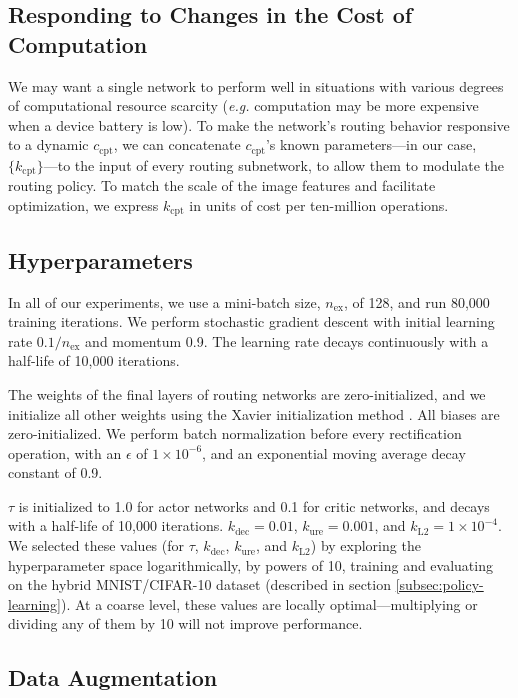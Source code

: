 \documentclass{article}
\begin{document}
  \subsection{Responding to Changes in the Cost of Computation}
  \label{subsec:dyn-kcpt}

  We may want a single network to perform well in situations with various degrees of computational resource scarcity (\textit{e.g.} computation may be more expensive when a device battery is low). To make the network's routing behavior responsive to a dynamic $c_\text{cpt}$, we can concatenate $c_\text{cpt}$'s known parameters---in our case, $\{k_\text{cpt}\}$---to the input of every routing subnetwork, to allow them to modulate the routing policy. To match the scale of the image features and facilitate optimization, we express $k_\text{cpt}$ in units of cost per ten-million operations.

  \subsection{Hyperparameters}
  
  In all of our experiments, we use a mini-batch size, $n_\text{ex}$, of 128, and run 80,000 training iterations. We perform stochastic gradient descent with initial learning rate $0.1/n_\text{ex}$ and momentum 0.9. The learning rate decays continuously with a half-life of 10,000 iterations.
  
  The weights of the final layers of routing networks are zero-initialized, and we initialize all other weights using the Xavier initialization method \cite{glorot2010understanding}. All biases are zero-initialized. We perform batch normalization \cite{ioffe2015batch} before every rectification operation, with an $\epsilon$ of $1\times10^{-6}$, and an exponential moving average decay constant of 0.9.
  
  $\tau$ is initialized to 1.0 for actor networks and 0.1 for critic networks, and decays with a half-life of 10,000 iterations. $k_\text{dec} = 0.01$, $k_\text{ure} = 0.001$, and $k_\text{L2} = 1\times10^{-4}$. We selected these values (for $\tau$, $k_\text{dec}$, $k_\text{ure}$, and $k_\text{L2}$) by exploring the hyperparameter space logarithmically, by powers of 10, training and evaluating on the hybrid MNIST/CIFAR-10 dataset (described in section \ref*{subsec:policy-learning}). At a coarse level, these values are locally optimal---multiplying or dividing any of them by 10 will not improve performance.

  \subsection{Data Augmentation}
\end{document}
